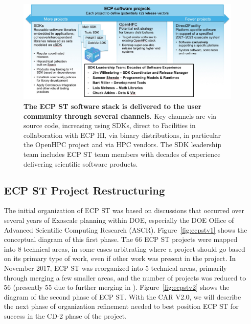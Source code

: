 \begin{figure}
	\centering
	\includegraphics[width=0.9\linewidth]{SoftwareStack}
	\caption{\textbf{The ECP ST software stack is delivered to the user community through several channels.} Key channels are via source code, increasing using SDKs, direct to Facilities in collaboration with ECP HI, via binary distributions, in particular the OpenHPC project and via HPC vendors.  The SDK leadership team includes  ECP ST team members with decades of experience delivering scientific software products.}
	\label{fig:softwarestack}
\end{figure}

\subsection{ECP ST Project Restructuring}\label{subsect:ProjectRestructuring}

The initial organization of ECP ST was based on discussions that occurred over several years of Exascale planning within DOE, especially the DOE Office of Advanced Scientific Computing Research (ASCR).  Figure~\ref{fig:ecpstv1} shows the conceptual diagram of this first phase.  The 66 ECP ST projects were mapped into 8 technical areas, in some cases arbitrating where a project should go based on its primary type of work, even if other work was present in the project.  In November 2017, ECP ST was reorganized into 5 technical areas, primarily through merging a few smaller areas, and the number of projects was reduced to 56 (presently 55 due to further merging in \ecosystem).  Figure~\ref{fig:ecpstv2} shows the diagram of the second phase of ECP ST.  With the CAR V2.0, we will describe the next phase of organization refinement needed to best position ECP ST for success in the CD-2 phase of the project.

